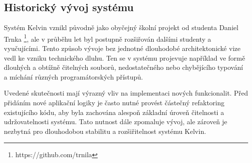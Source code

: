 \subsection{Historický vývoj systému}
\label{subsec:kelvin-history}

Systém Kelvin vznikl původně jako obyčejný školní projekt od studenta Daniel Trnka \footnote[1]{https://github.com/trnila}, ale v průběhu let byl postupně rozšiřován dalšími studenty a vyučujícími.
Tento způsob vývoje bez jednotné dlouhodobé architektonické vize vedl ke vzniku technického dluhu.
Ten se v systému projevuje například ve formě dlouhých a obtížně čitelných souborů, nedostatečného nebo chybějícího typování a míchání různých programátorských přístupů.

Uvedené skutečnosti mají výrazný vliv na implementaci nových funkcionalit.
Před přidáním nové aplikační logiky je často nutné provést částečný refaktoring existujícího kódu, aby byla zachována alespoň základní úroveň čitelnosti a udržovatelnosti systému.
Tato nutnost dále zpomaluje vývoj, ale zároveň je nezbytná pro dlouhodobou stabilitu a rozšiřitelnost systému Kelvin.

\endinput